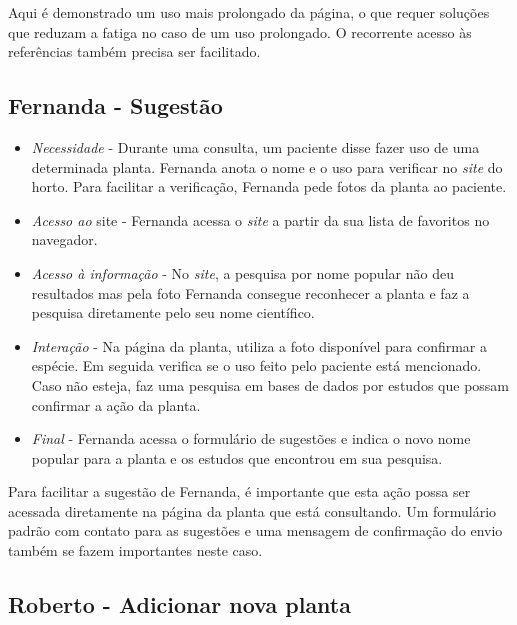 Aqui é demonstrado um uso mais prolongado da página, o que requer soluções que reduzam a fatiga no caso de um uso prolongado. O recorrente acesso às referências também precisa ser facilitado.

\subsection{Fernanda - Sugestão}\label{fernanda---sugestao}

\begin{itemize}
\item
  \emph{Necessidade} - Durante uma consulta, um paciente disse fazer uso de uma determinada planta. Fernanda anota o nome e o uso para verificar no \emph{site} do horto. Para facilitar a verificação, Fernanda pede fotos da planta ao paciente.
\item
  \emph{Acesso ao} site - Fernanda acessa o \emph{site} a partir da sua lista de favoritos no navegador.
\item
  \emph{Acesso à informação} - No \emph{site}, a pesquisa por nome popular não deu resultados mas pela foto Fernanda consegue reconhecer a planta e faz a pesquisa diretamente pelo seu nome científico.
\item
  \emph{Interação} - Na página da planta, utiliza a foto disponível para confirmar a espécie. Em seguida verifica se o uso feito pelo paciente está mencionado. Caso não esteja, faz uma pesquisa em bases de dados por estudos que possam confirmar a ação da planta.
\item
  \emph{Final} - Fernanda acessa o formulário de sugestões e indica o novo nome popular para a planta e os estudos que encontrou em sua pesquisa.
\end{itemize}

Para facilitar a sugestão de Fernanda, é importante que esta ação possa ser acessada diretamente na página da planta que está consultando. Um formulário padrão com contato para as sugestões e uma mensagem de confirmação do envio também se fazem importantes neste caso.

\subsection{Roberto - Adicionar nova planta}\label{roberto---adicionar-nova-planta}

